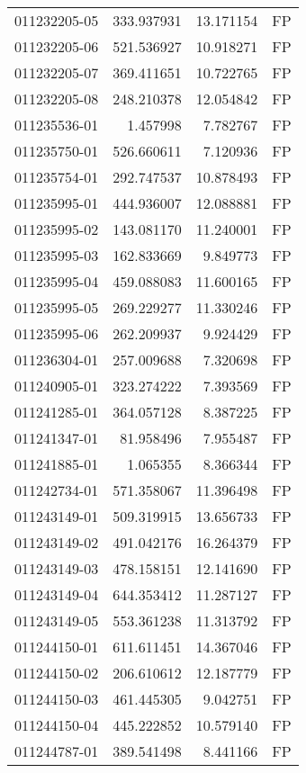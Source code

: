\begin{tabular}{lrrl}
011232205-05 &  333.937931 &    13.171154 &   FP \\
011232205-06 &  521.536927 &    10.918271 &   FP \\
011232205-07 &  369.411651 &    10.722765 &   FP \\
011232205-08 &  248.210378 &    12.054842 &   FP \\
011235536-01 &    1.457998 &     7.782767 &   FP \\
011235750-01 &  526.660611 &     7.120936 &   FP \\
011235754-01 &  292.747537 &    10.878493 &   FP \\
011235995-01 &  444.936007 &    12.088881 &   FP \\
011235995-02 &  143.081170 &    11.240001 &   FP \\
011235995-03 &  162.833669 &     9.849773 &   FP \\
011235995-04 &  459.088083 &    11.600165 &   FP \\
011235995-05 &  269.229277 &    11.330246 &   FP \\
011235995-06 &  262.209937 &     9.924429 &   FP \\
011236304-01 &  257.009688 &     7.320698 &   FP \\
011240905-01 &  323.274222 &     7.393569 &   FP \\
011241285-01 &  364.057128 &     8.387225 &   FP \\
011241347-01 &   81.958496 &     7.955487 &   FP \\
011241885-01 &    1.065355 &     8.366344 &   FP \\
011242734-01 &  571.358067 &    11.396498 &   FP \\
011243149-01 &  509.319915 &    13.656733 &   FP \\
011243149-02 &  491.042176 &    16.264379 &   FP \\
011243149-03 &  478.158151 &    12.141690 &   FP \\
011243149-04 &  644.353412 &    11.287127 &   FP \\
011243149-05 &  553.361238 &    11.313792 &   FP \\
011244150-01 &  611.611451 &    14.367046 &   FP \\
011244150-02 &  206.610612 &    12.187779 &   FP \\
011244150-03 &  461.445305 &     9.042751 &   FP \\
011244150-04 &  445.222852 &    10.579140 &   FP \\
011244787-01 &  389.541498 &     8.441166 &   FP \\

\end{tabular}
